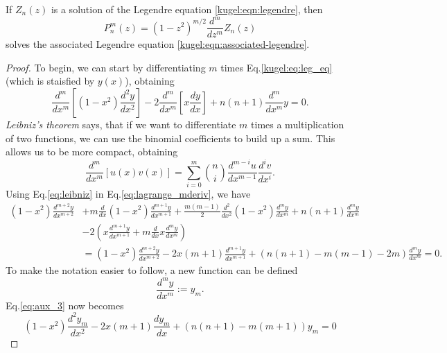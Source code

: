 \begin{lemma}
  If $Z_n(z)$ is a solution of the Legendre equation \eqref{kugel:eqn:legendre},
  then
  \begin{equation*}
    P^m_n(z) = (1 - z^2)^{m/2} \frac{d^m}{dz^m}Z_n(z)
  \end{equation*}
  solves the associated Legendre equation \eqref{kugel:eqn:associated-legendre}.
\end{lemma}
\begin{proof}
    To begin, we can start by differentiating $m$ times Eq.\eqref{kugel:eq:leg_eq} (which is staisfied by $y(x)$), obtaining
    \begin{equation}\label{eq:lagrange_mderiv}
    \frac{d^m}{dx^m}\left[ (1-x^2)\frac{d^2y}{dx^2} \right] -2 \frac{d^m}{dx^m}\left[ x\frac{dy}{dx} \right] + n(n+1)\frac{d^m}{dx^m}y=0.
    \end{equation}
    \emph{Leibniz's theorem} says, that if we want to differentiate $m$ times a multiplication of two functions, we can use the binomial coefficients to build up a sum. This allows us to be more compact, obtaining 
    \begin{equation}\label{eq:leibniz}
    \frac{d^m}{dx^m}[u(x)v(x)] = \sum_{i=0}^m \binom{n}{i} \frac{d^{m-i}u}{dx^{m-1}} \frac{d^{i}v}{dx^i}.
    \end{equation}
    Using Eq.\eqref{eq:leibniz} in Eq.\eqref{eq:lagrange_mderiv}, we have
    \begin{align}
    (1-x^2)\frac{d^{m+2}y}{dx^{m+2}} &+ m \frac{d}{dx}(1-x^2)\frac{d^{m+1}y}{dx^{m+1}} + \frac{m(m-1)}{2}\frac{d^{2}}{dx^{2}}(1-x^2)\frac{d^{m}y}{dx^{m}} + n(n+1)\frac{d^m{}y}{dx^{m}} \nonumber \\
    &-2\left(x\frac{d^{m+1}y}{dx^{m+1}} + m\frac{d}{dx}x\frac{d^{m}y}{dx^{m}} \right) \nonumber \\
    &= (1-x^2)\frac{d^{m+2}y}{dx^{m+2}} -2x(m+1)\frac{d^{m+1}y}{dx^{m+1}}+(n(n+1)-m(m-1)-2m)\frac{d^{m}y}{dx^{m}}=0. \label{eq:aux_3}
    \end{align}
    To make the notation easier to follow, a new function can be defined
    \begin{equation*}
    \frac{d^{m}y}{dx^{m}} := y_m.
    \end{equation*}
    Eq.\eqref{eq:aux_3} now becomes
    \begin{equation}\label{eq:1st_subs}
    (1-x^2)\frac{d^{2}y_m}{dx^{2}} -2x(m+1)\frac{dy_m}{dx}+(n(n+1)-m(m+1))y_m=0

\end{equation}
\end{proof}
